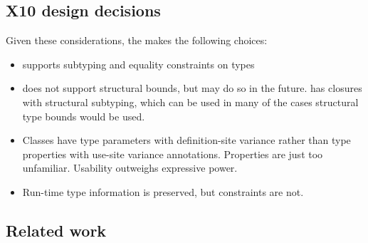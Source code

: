 \subsection{X10 design decisions}

Given these considerations, the \Xten makes the following choices:
\begin{itemize}
\item \Xten supports subtyping and equality constraints on types
\item \Xten does not support structural bounds, but may do so in
the future.  \Xten has closures with structural subtyping, which
can be used in many of the cases structural type bounds would be
used.
\item Classes have type parameters with definition-site variance
rather than type properties with use-site variance annotations.
Properties are just too unfamiliar.
Usability outweighs expressive power. 
\item Run-time type information is preserved, but constraints
are not.  
\end{itemize}


\subsection{Related work}
\label{sec:related}

